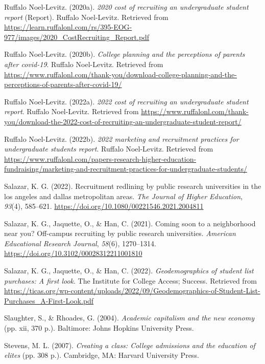 \documentclass[
  12pt,
]{article}
\newlength{\cslhangindent}
\newenvironment{CSLReferences}[2] %
 {\begin{list}{}{%
  \setlength{\itemindent}{0pt}
  \setlength{\leftmargin}{0pt}
  \setlength{\parsep}{0pt}
  \ifodd #1
   \setlength{\leftmargin}{\cslhangindent}
   \setlength{\itemindent}{-1\cslhangindent}
  \fi
  \setlength{\itemsep}{#2\baselineskip}}}
 {\end{list}}
\begin{document}
\begin{CSLReferences}{1}{0}
Ruffalo Noel-Levitz. (2020a). \emph{2020 cost of recruiting an undergraduate student report} (Report). Ruffalo Noel-Levitz. Retrieved from \url{https://learn.ruffalonl.com/rs/395-EOG-977/images/2020_CostRecruiting_Report.pdf}

Ruffalo Noel-Levitz. (2020b). \emph{College planning and the perceptions of parents after covid-19}. Ruffalo Noel-Levitz. Retrieved from \url{https://www.ruffalonl.com/thank-you/download-college-planning-and-the-perceptions-of-parents-after-covid-19/}

Ruffalo Noel-Levitz. (2022a). \emph{2022 cost of recruiting an undergraduate student report}. Ruffalo Noel-Levitz. Retrieved from \url{https://www.ruffalonl.com/thank-you/download-the-2022-cost-of-recruiting-an-undergraduate-student-report/}

Ruffalo Noel-Levitz. (2022b). \emph{2022 marketing and recruitment practices for undergraduate students report}. Ruffalo Noel-Levitz. Retrieved from \url{https://www.ruffalonl.com/papers-research-higher-education-fundraising/marketing-and-recruitment-practices-for-undergraduate-students/}

Salazar, K. G. (2022). Recruitment redlining by public research universities in the los angeles and dallas metropolitan areas. \emph{The Journal of Higher Education}, \emph{93}(4), 585--621. \url{https://doi.org/10.1080/00221546.2021.2004811}

Salazar, K. G., Jaquette, O., \& Han, C. (2021). Coming soon to a neighborhood near you? Off-campus recruiting by public research universities. \emph{American Educational Research Journal}, \emph{58}(6), 1270--1314. \url{https://doi.org/10.3102/00028312211001810}

Salazar, K. G., Jaquette, O., \& Han, C. (2022). \emph{Geodemographics of student list purchases: A first look}. The Institute for College Access; Success. Retrieved from \url{https://ticas.org/wp-content/uploads/2022/09/Geodemographics-of-Student-List-Purchases_A-First-Look.pdf}

Slaughter, S., \& Rhoades, G. (2004). \emph{Academic capitalism and the new economy} (pp. xii, 370 p.). Baltimore: Johns Hopkins University Press.

Stevens, M. L. (2007). \emph{Creating a class: College admissions and the education of elites} (pp. 308 p.). Cambridge, MA: Harvard University Press.


\end{CSLReferences}
\end{document}
